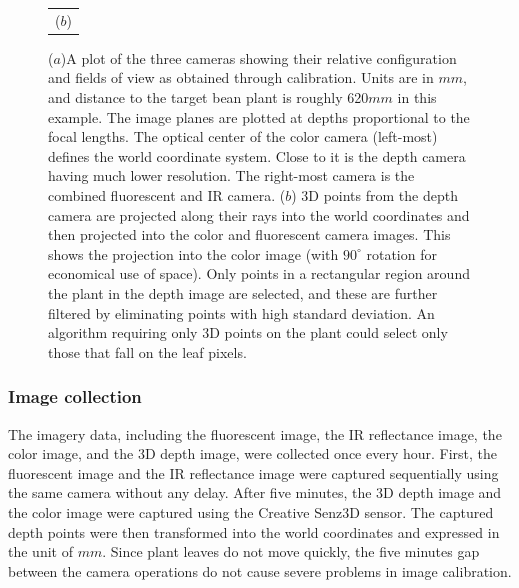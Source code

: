 \begin{figure}
\begin{tabular}{c}
  ($b$)\\
\end{tabular}
\caption{($a$)A plot of the three cameras showing their relative configuration and fields of view as obtained through calibration.  Units are in $mm$, and distance to the target bean plant is roughly 620$mm$ in this example.  The image planes are plotted at depths proportional to the focal lengths.  The optical center of the color camera (left-most) defines the world coordinate system.  Close to it is the depth camera having much lower resolution.  The right-most camera is the combined fluorescent and IR camera. ($b$) $3$D points from the depth camera are projected along their rays into the world coordinates and then projected into the color and fluorescent camera images.  This shows the projection into the color image (with $90^{\circ}$ rotation for economical use of space).  Only points in a rectangular region around the plant in the depth image are selected, and these are further filtered by eliminating points with high standard deviation.  An algorithm requiring only $3$D points on the plant could select only those that fall on the leaf pixels.}
\label{fig:CameraConfiguration}
\end{figure}

\subsubsection{Image collection} 
The imagery data, including the fluorescent image, the IR reflectance image,  the color image, and the $3$D depth image, were collected once every hour. First, the fluorescent image and the IR reflectance image were captured sequentially using the same camera without any delay.
% 
After five minutes, the $3$D depth image and the color image were captured using the Creative Senz3D sensor. The captured depth points were then transformed into the world coordinates and expressed in the unit of $mm$. Since plant leaves do not move quickly, the five minutes gap between the camera operations do not cause severe problems in image calibration.




